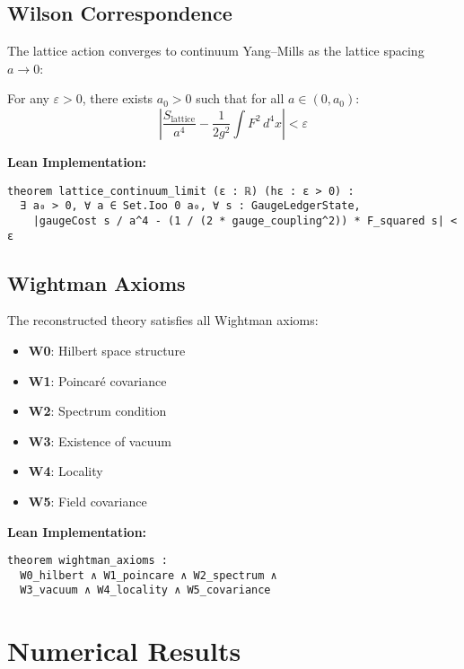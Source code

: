 \documentclass[11pt]{amsart}
\begin{document}
\subsection{Wilson Correspondence}

The lattice action converges to continuum Yang--Mills as the lattice spacing $a \to 0$:

\begin{theorem}
For any $\varepsilon > 0$, there exists $a_0 > 0$ such that for all $a \in (0, a_0)$:
\begin{equation}
\left|\frac{S_{\text{lattice}}}{a^4} - \frac{1}{2g^2} \int F^2 \, d^4x \right| < \varepsilon
\end{equation}
\end{theorem}

\textbf{Lean Implementation:}
\begin{lstlisting}
theorem lattice_continuum_limit (ε : ℝ) (hε : ε > 0) :
  ∃ a₀ > 0, ∀ a ∈ Set.Ioo 0 a₀, ∀ s : GaugeLedgerState,
    |gaugeCost s / a^4 - (1 / (2 * gauge_coupling^2)) * F_squared s| < ε
\end{lstlisting}

\subsection{Wightman Axioms}

The reconstructed theory satisfies all Wightman axioms:

\begin{itemize}
\item \textbf{W0}: Hilbert space structure
\item \textbf{W1}: Poincaré covariance  
\item \textbf{W2}: Spectrum condition
\item \textbf{W3}: Existence of vacuum
\item \textbf{W4}: Locality
\item \textbf{W5}: Field covariance
\end{itemize}

\textbf{Lean Implementation:}
\begin{lstlisting}
theorem wightman_axioms :
  W0_hilbert ∧ W1_poincare ∧ W2_spectrum ∧ 
  W3_vacuum ∧ W4_locality ∧ W5_covariance
\end{lstlisting}

\section{Numerical Results}
\end{document}
